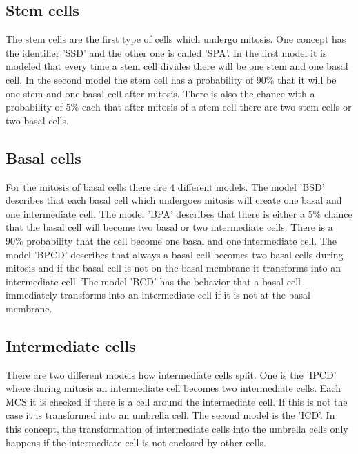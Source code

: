 \subsection{Stem cells}
The stem cells are the first type of cells which undergo mitosis. One concept has the identifier 'SSD' and the other one is called 'SPA'. In the first model it is modeled that every time a stem cell divides there will be one stem and one basal cell. In the second model the stem cell has a probability of 90\% that it will be one stem and one basal cell after mitosis. There is also the chance with a probability of 5\% each that after mitosis of a stem cell there are two stem cells or two basal cells.
\subsection{Basal cells}
For the mitosis of basal cells there are 4 different models. The model 'BSD' describes that each basal cell which undergoes mitosis will create one basal and one intermediate cell. The model 'BPA' describes that there is either a 5\% chance that the basal cell will become two basal or two intermediate cells. There is a 90\% probability that the cell become one basal and one intermediate cell. The model 'BPCD' describes that always a basal cell becomes two basal cells during mitosis and if the basal cell is not on the basal membrane it transforms into an intermediate cell. The model 'BCD' has the behavior that a basal cell immediately transforms into an intermediate cell if it is not at the basal membrane.\newline
\subsection{Intermediate cells}
There are two different models how intermediate cells split. One is the 'IPCD' where during mitosis an intermediate cell becomes two intermediate cells. Each \ac{MCS} it is checked if there is a cell around the intermediate cell. If this is not the case it is transformed into an umbrella cell. The second model is the 'ICD'. In this concept, the transformation of intermediate cells into the umbrella cells only happens if the intermediate cell is not enclosed by other cells. \newline


